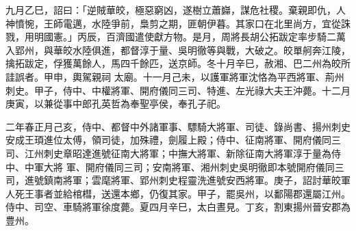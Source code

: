 \begin{pinyinscope}
 九月乙巳，詔曰：「逆賊華皎，極惡窮凶，遂樹立蕭巋，謀危社稷。棄親即仇，人神憤惋，王師電邁，水陸爭前，梟剪之期，匪朝伊暮。其家口在北里尚方，宜從誅戮，用明國憲。」丙辰，百濟國遣使獻方物。是月，周將長胡公拓跋定率步騎二萬入郢州，與華皎水陸俱進，都督淳于量、吳明徹等與戰，大破之。皎單舸奔江陵，擒拓跋定，俘獲萬餘人，馬四千餘匹，送京師。冬十月辛巳，赦湘、巴二州為皎所詿誤者。甲申，輿駕親祠
 太廟。十一月己未，以護軍將軍沈恪為平西將軍、荊州刺史。甲子，侍中、中權將軍、開府儀同三司、特進、左光祿大夫王沖薨。十二月庚寅，以兼從事中郎孔英哲為奉聖亭侯，奉孔子祀。



 二年春正月己亥，侍中、都督中外諸軍事、驃騎大將軍、司徒、錄尚書、揚州刺史安成王頊進位太傅，領司徒，加殊禮，劍履上殿；侍中、征南將軍、開府儀同三司、江州刺史章昭達進號征南大將軍；中撫大將軍、新除征南大將軍淳于量為侍中、中軍大將
 軍、開府儀同三司；安南將軍、湘州刺史吳明徹即本號開府儀同三司，進號鎮南將軍；雲麾將軍、郢州刺史程靈洗進號安西將軍。庚子，詔討華皎軍人死王事者並給棺槥，送還本鄉，仍復其家。甲子，罷吳州，以鄱陽郡還屬江州。侍中、司空、車騎將軍徐度薨。夏四月辛巳，太白晝見。丁亥，割東揚州晉安郡為豊州。




\end{pinyinscope}
